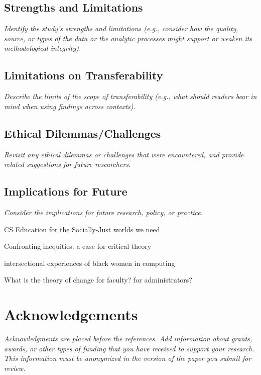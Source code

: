 \documentclass[acmsmall]{acmart}
\begin{document}
\subsection{Strengths and Limitations}

{\em\small Identify the study’s strengths and limitations (e.g., consider how the quality, source, or types of the data or the analytic processes might support or weaken its methodological integrity).}

\subsection{Limitations on Transferability}

{\em\small Describe the limits of the scope of transferability (e.g., what should readers bear in mind when using findings across contexts). }

\subsection{Ethical Dilemmas/Challenges}

{\em\small Revisit any ethical dilemmas or challenges that were encountered, and provide related suggestions for future researchers. }

\subsection{Implications for Future}

{\em\small Consider the implications for future research, policy, or practice.}

CS Education for the Socially-Just worlds we need

Confronting inequities: a case for critical theory

intersectional experiences of black women in computing

What is the theory of change for faculty? for administrators?

\section{Acknowledgements}

{\em\small Acknowledgments are placed before the references. Add information about grants, awards, or other types of funding that you have received to support your research. This information must be anonymized in the version of the paper you submit for review. }



\end{document}
